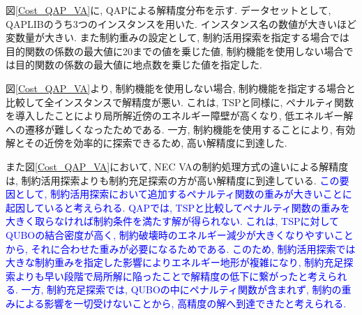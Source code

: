 \documentclass[submit,techrep,noauthor]{ipsj}
\begin{document}
図\ref{Cost_QAP_VA}に, QAPによる解精度分布を示す. データセットとして, QAPLIB\cite{qaplib}のうち3つのインスタンスを用いた. インスタンス名の数値が大きいほど変数量が大きい. また制約重みの設定として, 制約活用探索を指定する場合では目的関数の係数の最大値に20までの値を乗じた値, 制約機能を使用しない場合では目的関数の係数の最大値に地点数を乗じた値を指定した.

図\ref{Cost_QAP_VA}より, 制約機能を使用しない場合, 制約機能を指定する場合と比較して全インスタンスで解精度が悪い. これは, TSPと同様に, ペナルティ関数を導入したことにより局所解近傍のエネルギー障壁が高くなり, 低エネルギー解への遷移が難しくなったためである. 一方, 制約機能を使用することにより, 有効解とその近傍を効率的に探索できるため, 高い解精度に到達した.

また図\ref{Cost_QAP_VA}において, NEC VAの制約処理方式の違いによる解精度は, 制約活用探索よりも制約充足探索の方が高い解精度に到達している. \textcolor{blue}{この要因として, 制約活用探索において追加するペナルティ関数の重みが大きいことに起因していると考えられる. QAPでは, TSPと比較してペナルティ関数の重みを大きく取らなければ制約条件を満たす解が得られない. これは, TSPに対してQUBOの結合密度が高く, 制約破壊時のエネルギー減少が大きくなりやすいことから, それに合わせた重みが必要になるためである. このため, 制約活用探索では大きな制約重みを指定した影響によりエネルギー地形が複雑になり, 制約充足探索よりも早い段階で局所解に陥ったことで解精度の低下に繋がったと考えられる. 一方, 制約充足探索では, QUBOの中にペナルティ関数が含まれず, 制約の重みによる影響を一切受けないことから, 高精度の解へ到達できたと考えられる.}

\end{document}
